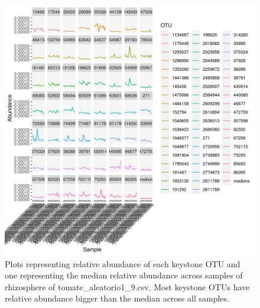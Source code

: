 \begin{figure}
   \centering
   \includegraphics[scale = 0.8]{abundance_tomate_aleatorio1_9.csv_key_otus_medians.png}
   \caption{Plots representing relative abundance of each keystone OTU and one representing the median relative abundance  across samples of rhizosphere of tomate_aleatorio1_9.csv. Most keystone OTUs have relative abundance bigger than the median across all samples.  }
   \label{key_otus_vs_medians_tomate_aleatorio1_9.csv}
\end{figure}

